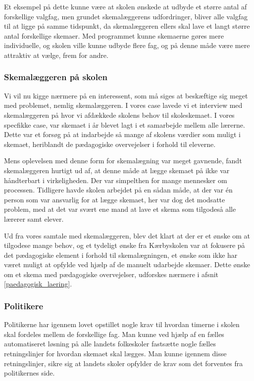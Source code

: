 Et eksempel på dette kunne være at skolen ønskede at udbyde et større antal af forskellige valgfag, men grundet skemalæggerens udfordringer, bliver alle valgfag til at ligge på samme tidspunkt, da skemalæggeren ellers skal lave et langt større antal forskellige skemaer. Med programmet kunne skemaerne gøres mere individuelle, og skolen ville kunne udbyde flere fag, og på denne måde være mere attraktiv at vælge, frem for andre.

\subsubsection{Skemalæggeren på skolen}
Vi vil nu kigge nærmere på en interessent, som må siges at beskæftige sig meget med problemet, nemlig skemalæggeren. I vores case lavede vi et interview med skemalæggeren på \school hvor vi afdækkede skolens behov til skoleskemaet. I vores specfikke case, var skemaet i år blevet lagt i et samarbejde mellem alle lærerne. Dette var et forsøg på at indarbejde så mange af skolens værdier som muligt i skemaet, heriblandt de pædagogiske overvejelser i forhold til eleverne.

Mens oplevelsen med denne form for skemalægning var meget gavnende, fandt skemalæggeren hurtigt ud af, at denne måde at lægge skemaet på ikke var håndterbart i virkeligheden. Der var simpelthen for mange mennesker om processen. Tidligere havde skolen arbejdet på en sådan måde, at der var \'en person som var ansvarlig for at lægge skemaet, her var dog det modsatte problem, med at det var svært ene mand at lave et skema som tilgodeså alle lærerer samt elever.

Ud fra vores samtale med skemalæggeren, blev det klart at der er et ønske om at tilgodese mange behov, og et tydeligt ønske fra Kærbyskolen var at fokusere på det pædagogiske element i forhold til skemalægningen, et ønske som ikke har været muligt at opfylde ved hjælp af de manuelt udarbejde skemaer. Dette ønske om et skema med pædagogiske overvejelser, udforskes nærmere i afsnit \ref{paedagogisk_laering}.

\subsubsection{Politikere}
Politikerne har igennem lovet opstillet nogle krav til hvordan timerne i skolen skal fordeles mellem de forskellige fag. Man kunne ved hjælp af en fælles automatiseret løsning på alle landets folkeskoler fastsætte nogle fælles retningslinjer for hvordan skemaet skal lægges. Man kunne igennem disse retningslinjer, sikre sig at landets skoler opfylder de krav som det forventes fra politikernes side. 

